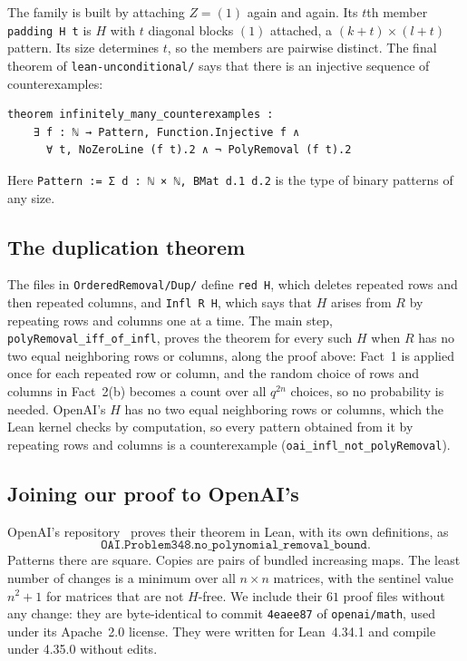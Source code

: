 \documentclass{article}
\theoremstyle{plain}
\theoremstyle{definition}
\begin{document}
\medskip
The family is built by attaching $Z=(1)$ again and again. Its $t$th member
\texttt{padding H t} is $H$ with $t$ diagonal blocks $(1)$ attached, a
$(k+t)\times(l+t)$ pattern. Its size determines $t$, so the members are
pairwise distinct. The final theorem of \texttt{lean-unconditional/} says that
there is an injective sequence of counterexamples:
\begin{lstlisting}
theorem infinitely_many_counterexamples :
    ∃ f : ℕ → Pattern, Function.Injective f ∧
      ∀ t, NoZeroLine (f t).2 ∧ ¬ PolyRemoval (f t).2
\end{lstlisting}
Here \lstinline[basicstyle=\ttfamily]|Pattern := Σ d : ℕ × ℕ, BMat d.1 d.2| is the type of binary
patterns of any size.

\subsection*{The duplication theorem}

\sloppy The files in \texttt{OrderedRemoval/Dup/} define \texttt{red H}, which deletes
repeated rows and then repeated columns, and \texttt{Infl R H}, which says that
$H$ arises from $R$ by repeating rows and columns one at a time. The main step,
\texttt{polyRemoval\_iff\_of\_infl}, proves the theorem for every such $H$ when
$R$ has no two equal neighboring rows or columns, along the proof above:
Fact~1 is applied once for each repeated row or column, and the random choice
of rows and columns in Fact~2(b) becomes a count over all $q^{2n}$ choices, so
no probability is needed. OpenAI's $H$ has no two equal neighboring rows or
columns, which the Lean kernel checks by computation, so every pattern obtained
from it by repeating rows and columns is a counterexample
(\texttt{oai\_infl\_not\_polyRemoval}).

\subsection*{Joining our proof to OpenAI's}

OpenAI's repository~\cite{openaiLean} proves their theorem in Lean, with its
own definitions, as
\[
  \texttt{OAI.Problem348.no\_polynomial\_removal\_bound}.
\] Patterns there are square. Copies are pairs of bundled increasing
maps. The least number of changes is a minimum over all $n\times n$ matrices,
with the sentinel value $n^2+1$ for matrices that are not $H$-free. We include
their $61$ proof files without any change: they are byte-identical to commit
\texttt{4eaee87} of \texttt{openai/math}, used under its Apache~2.0 license.
They were written for Lean~4.34.1 and compile under 4.35.0 without edits.
\end{document}
